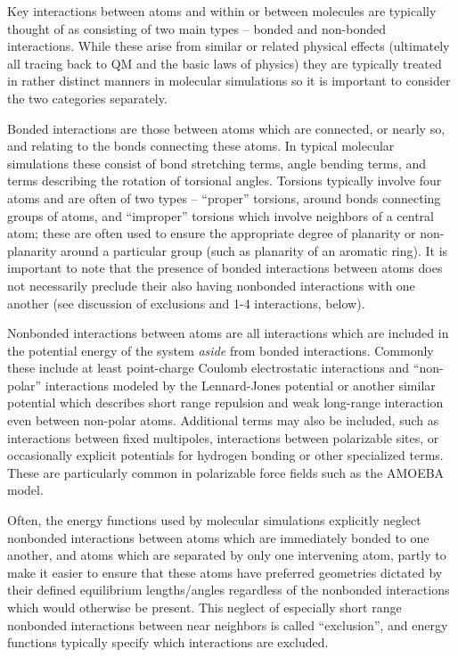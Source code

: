 \documentclass[9pt,bestpractices]{livecoms}
\begin{document}
Key interactions between atoms and within or between molecules are typically thought of as consisting of two main types -- bonded and non-bonded interactions. 
While these arise from similar or related physical effects (ultimately all tracing back to QM and the basic laws of physics) they are typically treated in rather distinct manners in molecular simulations so it is important to consider the two categories
separately.

Bonded interactions are those between atoms which are connected, or nearly so, and relating to the bonds connecting these atoms. 
In typical molecular simulations these consist of bond stretching terms, angle bending terms, and terms describing the rotation of torsional angles. 
Torsions typically involve four atoms and are often of two types -- ``proper'' torsions, around bonds connecting groups of atoms, and ``improper''
torsions which involve neighbors of a central atom; these are often used to ensure the appropriate degree of planarity or non-planarity around a particular group (such as planarity of an aromatic ring). 
It is important to note that the presence of bonded interactions between atoms does not necessarily preclude their also having nonbonded interactions with one another (see discussion of exclusions and 1-4 interactions, below).

Nonbonded interactions between atoms are all interactions which are included in the potential energy of the system \emph{aside} from bonded interactions.  
Commonly these include at least point-charge Coulomb electrostatic interactions and ``non-polar'' interactions modeled by the Lennard-Jones potential or another similar potential which describes short range repulsion and weak long-range interaction even between non-polar atoms.
Additional terms may also be included, such as interactions between fixed multipoles, interactions between polarizable sites, or occasionally explicit potentials for hydrogen bonding or other specialized terms.
These are particularly common in polarizable force fields such as the AMOEBA model.

Often, the energy functions used by molecular simulations explicitly neglect nonbonded interactions between atoms which are immediately bonded to one
another, and atoms which are separated by only one intervening atom, partly to make it easier to ensure that these atoms have preferred geometries dictated by their defined equilibrium lengths/angles regardless of the nonbonded interactions which would otherwise be present.
This neglect of especially short range nonbonded interactions between near neighbors is called ``exclusion'', and energy functions typically specify which interactions are excluded.
\end{document}
